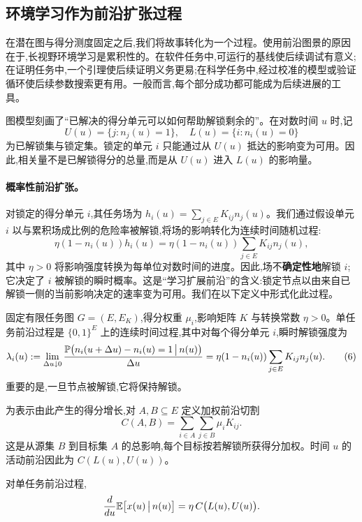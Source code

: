 \subsection{环境学习作为前沿扩张过程}
\label{app:frontier}

在潜在图与得分测度固定之后,我们将故事转化为一个过程。使用前沿图景的原因在于,长视野环境学习是累积性的。在软件任务中,可运行的基线使后续调试有意义;在证明任务中,一个引理使后续证明义务更易;在科学任务中,经过校准的模型或验证循环使后续参数搜索更有用。一般而言,每个部分成功都可能成为后续进展的工具。

图模型刻画了``已解决的得分单元可以如何帮助解锁剩余的''。在对数时间 $u$ 时,记
\[
    U(u) = \{j : n_{j}(u) = 1\}, \quad
    L(u) = \{i : n_{i}(u) = 0\}
\]
为已解锁集与锁定集。锁定的单元 $i$ 只能通过从 $U(u)$ 抵达的影响变为可用。因此,相关量不是已解锁得分的总量,而是从 $U(u)$ 进入 $L(u)$ 的影响量。

\paragraph{概率性前沿扩张。} 对锁定的得分单元 $i$,其任务场为 $h_{i}(u) = \sum_{j \in E} K_{ij} n_{j}(u)$。我们通过假设单元 $i$ 以与累积场成比例的危险率被解锁,将场的影响转化为连续时间随机过程:
\[
    \eta (1 - n_{i}(u)) h_{i}(u) = \eta (1 - n_{i}(u)) \sum_{j \in E} K_{ij} n_{j}(u),
\]
其中 $\eta > 0$ 将影响强度转换为每单位对数时间的进度。因此,场不\textbf{确定性地}解锁 $i$;它决定了 $i$ 被解锁的瞬时概率。这是``学习扩展前沿''的含义:锁定节点以由来自已解锁一侧的当前影响决定的速率变为可用。我们在以下定义中形式化此过程。

\begin{definition}[单任务前沿过程]
固定有限任务图 $G = (E, E_{K})$,得分权重 $\mu_{i}$,影响矩阵 $K$ 与转换常数 $\eta > 0$。单任务前沿过程是 $\{0, 1\}^{E}$ 上的连续时间过程,其中对每个得分单元 $i$,瞬时解锁强度为
\[
    \lambda_{i}(u) := \lim_{\Delta u \downarrow 0} \frac{\mathbb{P}\bigl(n_{i}(u + \Delta u) - n_{i}(u) = 1 \,\big|\, n(u)\bigr)}{\Delta u}
    = \eta (1 - n_{i}(u)) \sum_{j \in E} K_{ij} n_{j}(u). \tag{6}
\]
重要的是,一旦节点被解锁,它将保持解锁。
\end{definition}

为表示由此产生的得分增长,对 $A, B \subseteq E$ 定义加权前沿切割
\[
    C(A, B) = \sum_{i \in A} \sum_{j \in B} \mu_{i} K_{ij}.
\]
这是从源集 $B$ 到目标集 $A$ 的总影响,每个目标按若解锁所获得分加权。时间 $u$ 的活动前沿因此为 $C(L(u), U(u))$。

\begin{lemma}[单任务前沿精确增长率]
对单任务前沿过程,
\[
    \frac{d}{du} \mathbb{E}\bigl[x(u) \,\big|\, n(u)\bigr] = \eta\, C\bigl(L(u), U(u)\bigr).
\]
\end{lemma}

